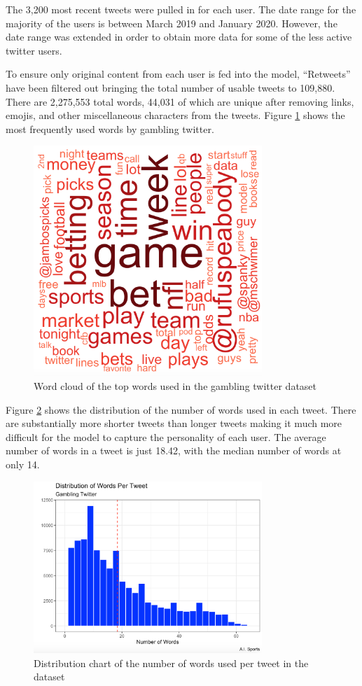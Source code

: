\documentclass[5p,authoryear]{elsarticle}
\begin{document}
The 3,200 most recent tweets were pulled in for each user. The date range for the majority of the users is between March 2019 and January 2020. However, the date range was extended in order to obtain more data for some of the less active twitter users.

To ensure only original content from each user is fed into the model, “Retweets” have been filtered out bringing the total number of usable tweets to 109,880. There are 2,275,553 total words, 44,031 of which are unique after removing links, emojis, and other miscellaneous characters from the tweets. Figure \ref{Top Words} shows the most frequently used words by gambling twitter. 



\begin{figure}[!htb] \centering
	\includegraphics[width=3.4in]{figures/Top_Words.png}
	\caption[]{Word cloud of the top words used in the gambling twitter dataset} 
	\label{Top Words} 
\end{figure}


Figure \ref{word_dist} shows the distribution of the number of words used in each tweet. There are substantially more shorter tweets than longer tweets making it much more difficult for the model to capture the personality of each user. The average number of words in a tweet is just 18.42, with the median number of words at only 14. 

\begin{figure}[!htb] \centering
	\includegraphics[width=3.4in]{figures/Words_per_Tweet.png}
	\caption[]{Distribution chart of the number of words used per tweet in the dataset} 
	\label{word_dist} 
\end{figure}
\end{document}
